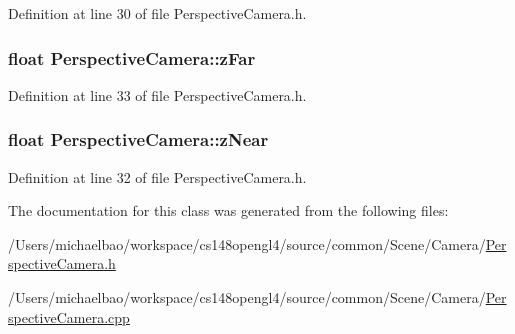 Definition at line 30 of file Perspective\+Camera.\+h.

\hypertarget{class_perspective_camera_af88e6161cd3c818d49e6421f52474a2b}{}
\subsubsection[{z\+Far}]{\setlength{\rightskip}{0pt plus 5cm}float Perspective\+Camera\+::z\+Far\hspace{0.3cm}{\ttfamily [private]}}\label{class_perspective_camera_af88e6161cd3c818d49e6421f52474a2b}


Definition at line 33 of file Perspective\+Camera.\+h.

\hypertarget{class_perspective_camera_a11c1dcd1bdeb4bf8294d6272fb4d2695}{}
\subsubsection[{z\+Near}]{\setlength{\rightskip}{0pt plus 5cm}float Perspective\+Camera\+::z\+Near\hspace{0.3cm}{\ttfamily [private]}}\label{class_perspective_camera_a11c1dcd1bdeb4bf8294d6272fb4d2695}


Definition at line 32 of file Perspective\+Camera.\+h.



The documentation for this class was generated from the following files\+:\begin{DoxyCompactItemize}
\item 
/\+Users/michaelbao/workspace/cs148opengl4/source/common/\+Scene/\+Camera/\hyperlink{_perspective_camera_8h}{Perspective\+Camera.\+h}\item 
/\+Users/michaelbao/workspace/cs148opengl4/source/common/\+Scene/\+Camera/\hyperlink{_perspective_camera_8cpp}{Perspective\+Camera.\+cpp}\end{DoxyCompactItemize}
